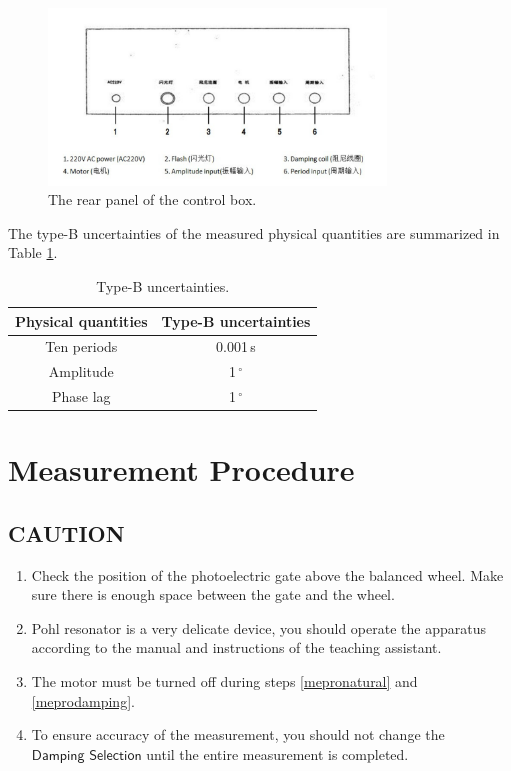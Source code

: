 \documentclass[a4paper]{article}
\begin{document}
\begin{figure}[htbp]
\begin{center}
\includegraphics[width=0.8\textwidth]{controlboxrear.png}
\caption{The rear panel of the control box.}\label{Fig:controlboxrear}
\end{center}
\end{figure}

The type-B uncertainties of the measured physical quantities are summarized in Table \ref{Tab:typebuncertainties}.

\begin{table}[htbp]
\begin{center}
\begin{tabular}{cc}
\hline
Physical quantities & Type-B uncertainties \\ \hline
Ten periods         & 0.001\,s             \\
Amplitude           & 1\,$^{\circ}$        \\
Phase lag           & 1\,$^{\circ}$        \\ \hline
\end{tabular}
\caption{Type-B uncertainties.}\label{Tab:typebuncertainties}
\end{center}
\end{table}



\section{Measurement Procedure}\label{Sec:mepro}

\subsection*{CAUTION}
\begin{enumerate}
\item Check the position of the photoelectric gate above the balanced wheel. Make sure there is enough space between the gate and the wheel.
\item Pohl resonator is a very delicate device, you should operate the apparatus according to the manual and instructions of the teaching assistant.
\item The motor must be turned off during steps \ref{mepronatural} and \ref{meprodamping}.
\item To ensure accuracy of the measurement, you should not change the $\textsf{Damping Selection}$ until the entire measurement is completed.
\end{enumerate}
\end{document}
